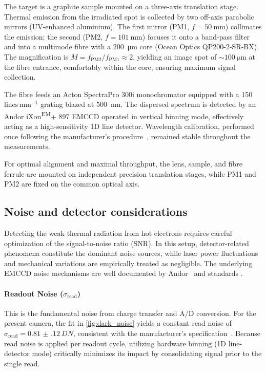 \documentclass[
	a4paper,
]{scrarticle}
\begin{document}
The target is a graphite sample mounted on a three-axis translation stage. Thermal emission from the irradiated spot is collected by two off-axis parabolic mirrors (UV-enhanced aluminium). The first mirror (PM1, \(f=\SI{50}{\milli\metre}\)) collimates the emission; the second (PM2, \(f=\SI{101}{\milli\metre}\)) focuses it onto a band-pass filter and into a multimode fibre with a \SI{200}{\micro\metre} core (Ocean Optics QP200-2-SR-BX). The magnification is \(M = f_{\mathrm{PM2}}/f_{\mathrm{PM1}} \approx 2\), yielding an image spot of \(\sim\SI{100}{\micro\metre}\) at the fibre entrance, comfortably within the core, ensuring maximum signal collection.

The fibre feeds an Acton SpectraPro 300i monochromator equipped with a 150\,lines\,mm\(^{-1}\) grating blazed at \SI{500}{\nano\metre}. The dispersed spectrum is detected by an Andor iXon\textsuperscript{EM}+ 897 EMCCD operated in vertical binning mode, effectively acting as a high-sensitivity 1D line detector.
Wavelength calibration, performed once following the manufacturer’s procedure~\cite{roobThermalRadiationUltrafast2025}, remained stable throughout the measurements.

For optimal alignment and maximal throughput, the lens, sample, and fibre ferrule are mounted on independent precision translation stages, while PM1 and PM2 are fixed on the common optical axis.

\subsection{Noise and detector considerations}
Detecting the weak thermal radiation from hot electrons requires careful optimization of the signal-to-noise ratio (SNR). In this setup, detector-related phenomena constitute the dominant noise sources, while laser power fluctuations and mechanical variations are empirically treated as negligible. The underlying EMCCD noise mechanisms are well documented by Andor~\cite{dr.jowaltersSensitivityNoiseCCD2023,andorEstablishingSensitivityScientifica} and standards \cite{europeanmachinevisionassociationStandardCharacterizationImage2010}.

\paragraph{Readout Noise ($\sigma_{\text{read}}$)}
This is the fundamental noise from charge transfer and A/D conversion. For the present camera, the fit in \autoref{fig:dark_noise} yields a constant read noise of
\(\sigma_{\text{read}}=\SI{0.81(12)}{DN}\), consistent with the manufacturer’s specification~\cite{andorIXonEM897Manual}.
Because read noise is applied per readout cycle, utilizing hardware binning (1D line-detector mode) critically minimizes its impact by consolidating signal prior to the single read.
\end{document}
